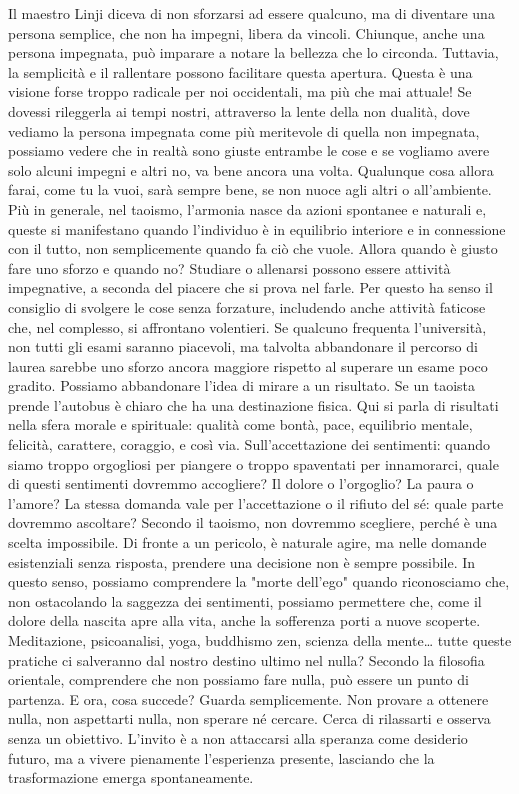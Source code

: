 \documentclass[12pt]{book} %
\begin{document}
Il maestro Linji diceva di non sforzarsi ad essere qualcuno, ma di diventare una persona semplice, che non ha impegni, libera da vincoli. Chiunque, anche una persona impegnata, può imparare a notare la bellezza che lo circonda. Tuttavia, la semplicità e il rallentare possono facilitare questa apertura. Questa è una visione forse troppo radicale per noi occidentali, ma più che mai attuale! Se dovessi rileggerla ai tempi nostri, attraverso la lente della non dualità, dove vediamo la persona impegnata come più meritevole di quella non impegnata, possiamo vedere che in realtà sono giuste entrambe le cose e se vogliamo avere solo alcuni impegni e altri no, va bene ancora una volta.
Qualunque cosa allora farai, come tu la vuoi, sarà sempre bene, se non nuoce agli altri o all'ambiente. Più in generale, nel taoismo, l’armonia nasce da azioni spontanee e naturali e, queste si manifestano quando l’individuo è in equilibrio interiore e in connessione con il tutto, non semplicemente quando fa ciò che vuole.
Allora quando è giusto fare uno sforzo e quando no? Studiare o allenarsi possono essere attività impegnative, a seconda del piacere che si prova nel farle. Per questo ha senso il consiglio di svolgere le cose senza forzature, includendo anche attività faticose che, nel complesso, si affrontano volentieri. Se qualcuno frequenta l'università, non tutti gli esami saranno piacevoli, ma talvolta abbandonare il percorso di laurea sarebbe uno sforzo ancora maggiore rispetto al superare un esame poco gradito.
Possiamo abbandonare l'idea di mirare a un risultato. Se un taoista prende l'autobus è chiaro che ha una destinazione fisica. Qui si parla di risultati nella sfera morale e spirituale: qualità come bontà, pace, equilibrio mentale, felicità, carattere, coraggio, e così via.
Sull'accettazione dei sentimenti: quando siamo troppo orgogliosi per piangere o troppo spaventati per innamorarci, quale di questi sentimenti dovremmo accogliere? Il dolore o l'orgoglio? La paura o l'amore?
La stessa domanda vale per l'accettazione o il rifiuto del sé: quale parte dovremmo ascoltare? Secondo il taoismo, non dovremmo scegliere, perché è una scelta impossibile. Di fronte a un pericolo, è naturale agire, ma nelle domande esistenziali senza risposta, prendere una decisione non è sempre possibile.
In questo senso, possiamo comprendere la "morte dell'ego" quando riconosciamo che, non ostacolando la saggezza dei sentimenti, possiamo permettere che, come il dolore della nascita apre alla vita, anche la sofferenza porti a nuove scoperte.
Meditazione, psicoanalisi, yoga, buddhismo zen, scienza della mente… tutte queste pratiche ci salveranno dal nostro destino ultimo nel nulla? Secondo la filosofia orientale, comprendere che non possiamo fare nulla, può essere un punto di partenza. E ora, cosa succede? Guarda semplicemente. Non provare a ottenere nulla, non aspettarti nulla, non sperare né cercare. Cerca di rilassarti e osserva senza un obiettivo. L’invito è a non attaccarsi alla speranza come desiderio futuro, ma a vivere pienamente l’esperienza presente, lasciando che la trasformazione emerga spontaneamente.
\end{document}
